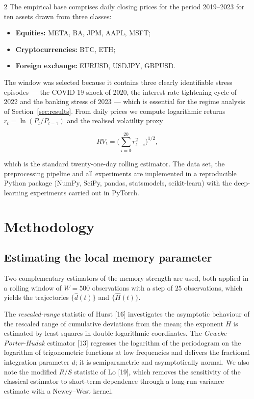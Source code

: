\documentclass[a4paper,10pt,twoside]{article}
\begin{document}
\begin{multicols}{2}
The empirical base comprises daily closing prices for the period 2019--2023 for ten assets drawn
from three classes:

\begin{itemize}
\item \textbf{Equities:} META, BA, JPM, AAPL, MSFT;
\item \textbf{Cryptocurrencies:} BTC, ETH;
\item \textbf{Foreign exchange:} EURUSD, USDJPY, GBPUSD.
\end{itemize}

The window was selected because it contains three clearly identifiable stress episodes --- the
COVID-19 shock of 2020, the interest-rate tightening cycle of 2022 and the banking stress of 2023 ---
which is essential for the regime analysis of Section~\ref{sec:results}. From daily prices we
compute logarithmic returns $r_t=\ln(P_t/P_{t-1})$ and the realised volatility proxy

\begin{equation}\label{eq:rv}
RV_t=\Big(\sum_{i=0}^{20} r_{t-i}^2\Big)^{1/2},
\end{equation}

which is the standard twenty-one-day rolling estimator. The data set, the preprocessing pipeline and
all experiments are implemented in a reproducible Python package (NumPy, SciPy, pandas,
statsmodels, scikit-learn) with the deep-learning experiments carried out in PyTorch.


\section{Methodology}\label{sec:method}

\subsection{Estimating the local memory parameter}

Two complementary estimators of the memory strength are used, both applied in a rolling window of
$W=500$ observations with a step of $25$ observations, which yields the trajectories
$\{\hat d(t)\}$ and $\{\hat H(t)\}$.

The \emph{rescaled-range} statistic of Hurst [16] investigates the asymptotic
behaviour of the rescaled range of cumulative deviations from the mean; the exponent $H$ is
estimated by least squares in double-logarithmic coordinates. The \emph{Geweke--Porter-Hudak}
estimator [13] regresses the logarithm of the periodogram on the logarithm
of trigonometric functions at low frequencies and delivers the fractional integration parameter
$d$; it is semiparametric and asymptotically normal. We also note the modified $R/S$ statistic of
Lo [19], which removes the sensitivity of the classical estimator to short-term
dependence through a long-run variance estimate with a Newey--West kernel.


\end{multicols}
\end{document}
